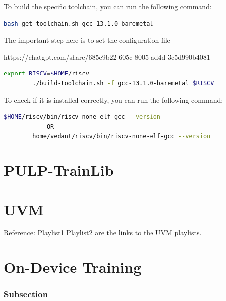 \documentclass[12pt, a4paper]{article}
\begin{document}
\begin{enumerate}
        To build the specific toolchain, you can run the following command:

        \begin{lstlisting}[language=bash, frame=single, basicstyle=\ttfamily\footnotesize]
        bash get-toolchain.sh gcc-13.1.0-baremetal
        \end{lstlisting}

        The important step here is to set the configuration file 
        
        https://chatgpt.com/share/685e9b22-605c-8005-ad4d-3c5d990b4081

        \begin{lstlisting}[language=bash, frame=single, basicstyle=\ttfamily\footnotesize]
        export RISCV=$HOME/riscv
        ./build-toolchain.sh -f gcc-13.1.0-baremetal $RISCV
        \end{lstlisting}

        To check if it is installed correctly, you can run the following command:
        \begin{lstlisting}[language=bash, frame=single, basicstyle=\ttfamily\footnotesize]
        $HOME/riscv/bin/riscv-none-elf-gcc --version
            OR
        home/vedant/riscv/bin/riscv-none-elf-gcc --version
        \end{lstlisting}

\end{enumerate}


\section{PULP-TrainLib}

\section{UVM}
Reference: \href{https://youtube.com/playlist?list=PLuYB6t6povcLgoHWLJgk-VeMQ0Rscjw03&si=l-rjyvLkuttomYeC}{Playlist1}
\href{https://youtube.com/playlist?list=PLqPfWwayuBvNrr09dCweog1htCBLUbN4W&si=4vI1Fs_sgz-A0wXdC}{Playlist2} are the links to the UVM playlists.

\section{On-Device Training}

\subsubsection{Subsection}
\end{document}
